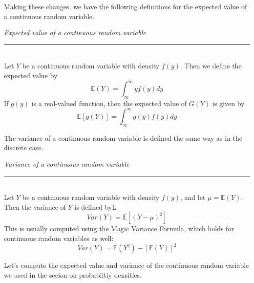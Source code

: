 \documentclass[12pt]{article}
\theoremstyle{definition}
\theoremstyle{remark}
\def\E{{\mathbb E}}
\begin{document}
Making these changes, we have the following definitions for the expected value of a continuous random variable.

\begin{framed}
\emph{Expected value of a continuous random variable}\\
  \rule{\dimexpr{}\fboxrule}{.1pt} \\
Let $Y$ be a continuous random variable with density $f(y)$. Then we define the expected value by
\[
\E(Y) = \int_{\infty}^\infty y f(y) dy
\]
If $g(y)$ is a real-valued function, then the expected value of $G(Y)$ is given by
\[
\E[g(Y)] = \int_{\infty}^\infty g(y) f(y) dy
\]
\end{framed}

The variance of a continuous random variable is defined the same way as in the discrete case.

\begin{framed}
\emph{Variance of a continuous random variable}\\
  \rule{\dimexpr{}\fboxrule}{.1pt} \\
Let $Y$ be a continuous random variable with density $f(y)$, and let $\mu = \E(Y)$. Then the variance of $Y$ is defined byL
\[
Var(Y) = \E[(Y - \mu)^2]
\]
This is usually computed using the Magic Variance Formula, which holds for continuous random variables as well:
\[
Var(Y) = \E(Y^2) - [\E(Y)]^2
\]
\end{framed}

Let's compute the expected value and variance of the continuous random variable we used in the secion on probabiltiy densities.
\end{document}
